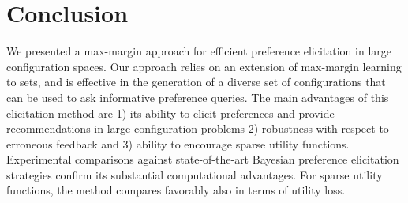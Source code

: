 \documentclass{article}
\renewcommand\[{\begin{equation}}
\renewcommand\]{\end{equation}}
\newcommand{\paolo}[1]{{\bf \textcolor{red}{{\fbox{Paolo:} #1}}}}
\begin{document}


\section{Conclusion}
\label{sec:conclusions}

We presented a max-margin approach for efficient preference
elicitation in large configuration spaces. Our approach relies on an
extension of max-margin learning to sets, and is
effective in the generation of a diverse set of configurations that can be used
to ask informative preference queries.  The main advantages of this
elicitation method are 1) its ability to elicit preferences and
provide recommendations in large configuration problems 2)
robustness with respect to erroneous feedback and 3)  ability to
encourage sparse utility functions. 
Experimental comparisons against
state-of-the-art Bayesian preference elicitation strategies confirm
its substantial computational advantages. For sparse utility
functions, the method compares favorably also in terms of utility loss.







\end{document}
